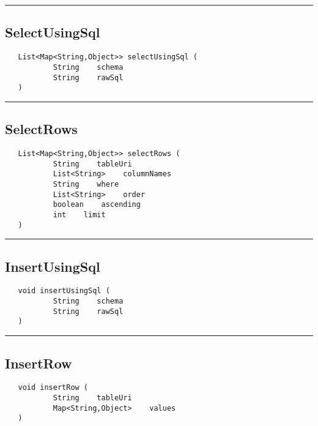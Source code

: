 \rule{15cm}{2pt}
\subsection{SelectUsingSql}
\label{Api:SelectUsingSql}
\begin{verbatim}
   List<Map<String,Object>> selectUsingSql (
           String    schema
           String    rawSql
   )
\end{verbatim}



\rule{15cm}{2pt}
\subsection{SelectRows}
\label{Api:SelectRows}
\begin{verbatim}
   List<Map<String,Object>> selectRows (
           String    tableUri
           List<String>    columnNames
           String    where
           List<String>    order
           boolean    ascending
           int    limit
   )
\end{verbatim}



\rule{15cm}{2pt}
\subsection{InsertUsingSql}
\label{Api:InsertUsingSql}
\begin{verbatim}
   void insertUsingSql (
           String    schema
           String    rawSql
   )
\end{verbatim}



\rule{15cm}{2pt}
\subsection{InsertRow}
\label{Api:InsertRow}
\begin{verbatim}
   void insertRow (
           String    tableUri
           Map<String,Object>    values
   )
\end{verbatim}



